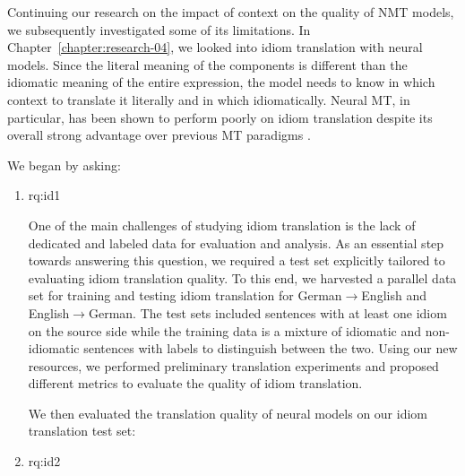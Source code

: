 \begin{enumerate}[label=\textbf{Research Question \arabic*:},ref={RQ\arabic*},wide = 0pt]
\medskip

Continuing our research on the impact of context on the quality of NMT models, we subsequently investigated some of its limitations. 
In Chapter~\ref{chapter:research-04}, we looked into idiom translation with neural models.
Since the literal meaning of the components is different than the idiomatic meaning of the entire expression, the model needs to know in which context to translate it literally and in which idiomatically. 
Neural MT, in particular, has been shown to perform poorly on idiom translation despite its overall strong advantage over previous MT paradigms \citep{isabelle2017challenge}. 

We began by asking:

\begin{enumerate}[label=\textbf{RQ3.\arabic* },wide = 0pt, leftmargin=2em]
\setlength\itemsep{1em}
\item \acl{rq:id1} \label{rq:id1}

\medskip

\noindent One of the main challenges of studying idiom translation is the lack of dedicated and labeled data for evaluation and analysis.
As an essential step towards answering this question, we required a test set explicitly tailored to evaluating idiom translation quality.
To this end, we harvested a parallel data set for training and testing idiom translation for German$\rightarrow$English and English$\rightarrow$German.
The test sets included sentences with at least one idiom on the source side while the training data is a mixture of idiomatic and non-idiomatic sentences with labels to distinguish between the two.
Using our new resources, 
we performed preliminary translation experiments and proposed different metrics to evaluate the quality of idiom translation.

\medskip

We then evaluated the translation quality of neural models on our idiom translation test set:

\item \acl{rq:id2} \label{rq:id2}

\medskip


\end{enumerate}
\end{enumerate}
